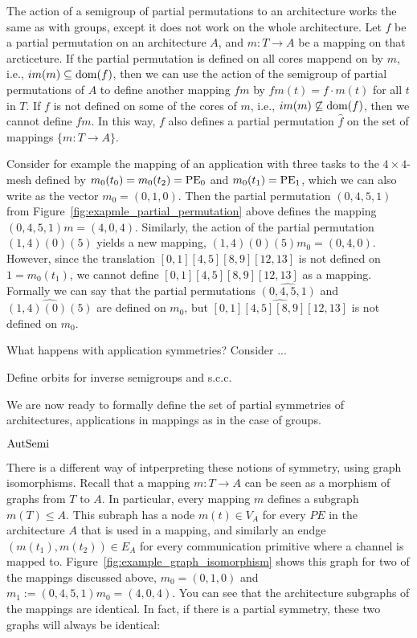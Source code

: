 The action of a semigroup of partial permutations to an architecture works the same as with groups, except it does not work on the whole architecture.
Let $f$ be a partial permutation on an architecture $A$, and $m : T \rightarrow A$ be a mapping on that arcticeture.
If the partial permutation is defined on all cores mappend on by $m$, i.e., $im(m) \subseteq \operatorname{dom}(f)$, then we can use the action of the semigroup of partial permutations of $A$ to define another mapping $fm$ by $fm(t) = f \cdot m(t)$
for all $t$ in $T$. If $f$ is not defined on some of the cores of $m$, i.e., $im(m) \not \subseteq \operatorname{dom}(f)$, then we cannot define $fm$. In this way, $f$ also defines a partial permutation $\hat f$ on the set of mappings $\{ m : T \rightarrow A \}$.

Consider for example the mapping of an application with three tasks to the $4 \times 4$-mesh defined by $m_0(t_0) = m_0(t_2) = \operatorname{PE}_0$ and $m_0(t_1) = \operatorname{PE}_1$, which we can also write as the vector $m_0 = (0,1,0)$.
Then the partial permutation $(0,4,5,1)$ from Figure~\ref{fig:exapmle_partial_permutation} above defines the mapping $(0,4,5,1)m = (4,0,4)$.
Similarly, the action of the partial permutation $(1,4)(0)(5)$ yields a new mapping, $(1,4)(0)(5)m_0 = (0,4,0)$.
However, since the translation $[0,1][4,5][8,9][12,13]$ is not defined on $1 = m_0(t_1)$, we cannot define $[0,1][4,5][8,9][12,13]$ as a mapping.
Formally we can say that the partial permutations $\widehat{(0,4,5,1)}$ and $\widehat{(1,4)(0)(5)}$ are defined on $m_0$, but $\widehat{[0,1][4,5][8,9][12,13]}$ is not defined on $m_0$.

What happens with application symmetries? Consider ...

Define orbits for inverse semigroups and s.c.c.

We are now ready to formally define the set of partial symmetries of architectures, applications in mappings as in the case of groups.
\begin{defn}
$\operatorname{AutSemi}$
\end{defn}

There is a different way of intperpreting these notions of symmetry, using graph isomorphisms.
Recall that a mapping $m: T \rightarrow A$ can be seen as a morphism of graphs from $T$ to $A$.
In particular, every mapping $m$ defines a subgraph $m(T) \leq A$.
This subraph has a node $m(t) \in V_A$ for every $PE$ in the architecture $A$ that is used in a mapping, and similarly an endge $(m(t_1),m(t_2)) \in E_A$ for every communication primitive where a channel is mapped to.
Figure~\ref{fig:example_graph_isomorphism} shows this graph for two of the mappings discussed above, $m_0 = (0,1,0)$ and $m_1 := (0,4,5,1)m_0 = (4,0,4)$. 
You can see that the architecture subgraphs of the mappings are identical. In fact, if there is a partial symmetry, these two graphs will always be identical:

